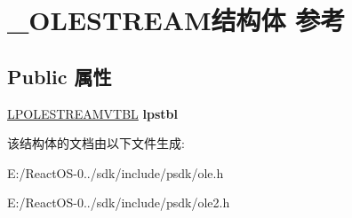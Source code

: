\hypertarget{struct___o_l_e_s_t_r_e_a_m}{}\section{\+\_\+\+O\+L\+E\+S\+T\+R\+E\+A\+M结构体 参考}
\label{struct___o_l_e_s_t_r_e_a_m}
\subsection*{Public 属性}
\begin{DoxyCompactItemize}
\item 
\mbox{\label{struct___o_l_e_s_t_r_e_a_m_a0f374547c26b0a545c84c02cb5818a3a}} 
\hyperlink{struct___o_l_e_s_t_r_e_a_m_v_t_b_l}{L\+P\+O\+L\+E\+S\+T\+R\+E\+A\+M\+V\+T\+BL} {\bfseries lpstbl}
\end{DoxyCompactItemize}


该结构体的文档由以下文件生成\+:\begin{DoxyCompactItemize}
\item 
E\+:/\+React\+O\+S-\/0../sdk/include/psdk/ole.\+h\item 
E\+:/\+React\+O\+S-\/0../sdk/include/psdk/ole2.\+h\end{DoxyCompactItemize}

